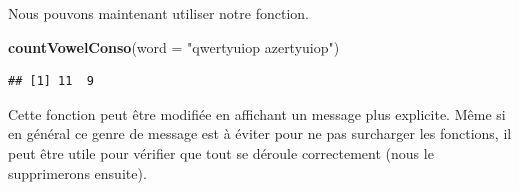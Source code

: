 \documentclass[
]{book}
\newenvironment{Shaded}{\begin{snugshade}}{\end{snugshade}}
\newcommand{\ControlFlowTok}[1]{\textcolor[rgb]{0.13,0.29,0.53}{\textbf{#1}}}
\newcommand{\DataTypeTok}[1]{\textcolor[rgb]{0.13,0.29,0.53}{#1}}
\newcommand{\DecValTok}[1]{\textcolor[rgb]{0.00,0.00,0.81}{#1}}
\newcommand{\KeywordTok}[1]{\textcolor[rgb]{0.13,0.29,0.53}{\textbf{#1}}}
\newcommand{\NormalTok}[1]{#1}
\newcommand{\OperatorTok}[1]{\textcolor[rgb]{0.81,0.36,0.00}{\textbf{#1}}}
\newcommand{\StringTok}[1]{\textcolor[rgb]{0.31,0.60,0.02}{#1}}
\begin{document}
\begin{Shaded}
\end{Shaded}

Nous pouvons maintenant utiliser notre fonction.

\begin{Shaded}
\begin{Highlighting}[]
\KeywordTok{countVowelConso}\NormalTok{(}\DataTypeTok{word =} \StringTok{"qwertyuiop azertyuiop"}\NormalTok{)}
\end{Highlighting}
\end{Shaded}

\begin{verbatim}
## [1] 11  9
\end{verbatim}

Cette fonction peut être modifiée en affichant un message plus explicite. Même si en général ce genre de message est à éviter pour ne pas surcharger les fonctions, il peut être utile pour vérifier que tout se déroule correctement (nous le supprimerons ensuite).
\end{document}
